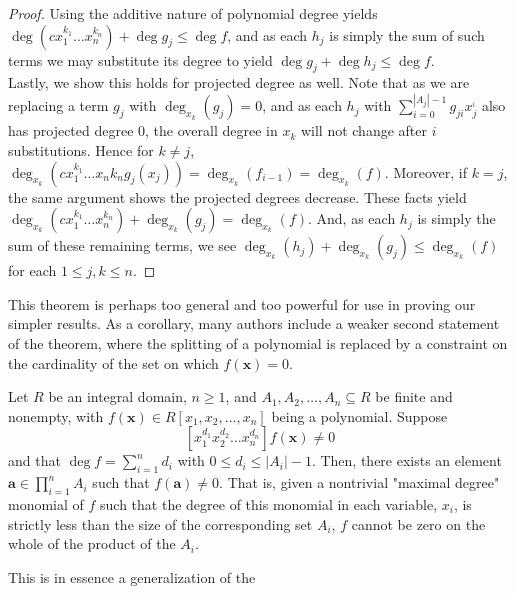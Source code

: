 \begin{proof}
Using the additive nature of polynomial degree yields $\deg \left( cx_1^{k_1}\ldots x_{n}^{ k_n} \right) + \deg g_j \le \deg f$,
and as each $h_j$ is simply the sum of such terms we may substitute its degree
to yield $\deg g_j + \deg h_j \le \deg f$.\\

Lastly, we show this holds for projected degree as well. Note that as we are replacing a term \(g_{j}\) with \(\deg _{x_{k}} \left(  g_{j} \right) = 0	 \), and as each \(h_{j}\) with \(\sum_{i=0}^{\left| A_{j} \right|- 1 }g_{ji}x_{j}^{_{i}}\) also has projected degree \(0\), the overall degree in \(x_{k}\) will not change after \(i\) substitutions. Hence for \(k \neq j\), \(\deg _{x_{k}} \left(  cx_1^{k_1}\ldots x_{n}{k_{n}} g_{j}\left( x_{j} \right) \right) = \deg _{x_{k}} \left( f_{i-1} \right) = \deg _{x_{k}} \left( f\right)    \). Moreover, if \(k = j\), the same argument shows the projected degrees decrease.
These facts yield \(\deg _{x_{k}} \left(cx_1^{k_1}\ldots x_{n}^{k_{n}} \right)  + \deg _{x_{k}} \left(g_{j} \right) = \deg _{x_{k}} \left(  f \right)  \). And, as each \(h_{j}\) is simply the sum of these remaining terms, we see \(\deg _{x_{k}} \left( h_{j} \right) + \deg _{x_{k}} \left( g_{j} \right)  \le \deg _{x_{k}} \left(  f \right)  \) for each \(1 \le j, k \le n\). \end{proof} This theorem is perhaps too general and too
powerful for use in proving our simpler results. As a corollary, many authors
include a weaker second statement of the theorem, where the splitting of a polynomial is replaced by a constraint on the cardinality of the set on which \(f\left( \textbf{x} \right)  = 0\).
\begin{theorem} Let
	$R$ be an integral domain, \(n \ge 1\), and $A_1, A_2, \ldots, A_n \subseteq R$ be
	finite and nonempty, with $f\left( \textbf{x} \right) \in R[x_1, x_2,
	\ldots, x_{n}]$ being a polynomial. Suppose \[ [x_1^{d_1}x_2^{d_2}\ldots
	x_{n}^{d_n}] f\left( \textbf{x} \right) \neq 0 \] and that $\deg f =
	\sum_{i=1}^{n} d_i$ with $0 \le d_i \le \left| A_i \right| -1$. Then,
	there exists an element\\ $ \textbf{a} \in \prod_{i= 1}^{n} A_i $ such
	that $f\left( \textbf{a} \right) \neq 0$. That is, given a nontrivial
	"maximal degree" monomial of $f$ such that the degree of this monomial
	in each variable, \(x_{i}\), is strictly less than the size of the
	corresponding set $A_i$, $f$ cannot be zero on the whole of the product
	of the $A_i$.  \end{theorem} This is in essence a generalization of the
